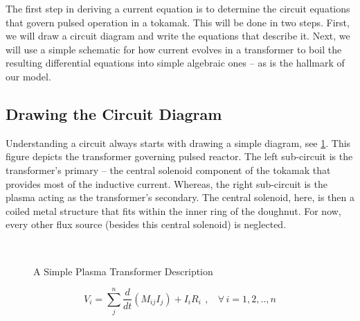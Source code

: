 The first step in deriving a current equation is to determine the circuit equations that govern pulsed operation in a tokamak. This will be done in two steps. First, we will draw a circuit diagram and write the equations that describe it. Next, we will use a simple schematic for how current evolves in a transformer to boil the resulting differential equations into simple algebraic ones -- as is the hallmark of our model.

\subsection{Drawing the Circuit Diagram}

Understanding a circuit always starts with drawing a simple diagram, see \cref{fig:circuit_diagram}. This figure depicts the transformer governing pulsed reactor. The left sub-circuit is the transformer's primary -- the central solenoid component of the tokamak that provides most of the inductive current. Whereas, the right sub-circuit is the plasma acting as the transformer's secondary. The central solenoid, here, is then a coiled metal structure that fits within the inner ring of the doughnut. For now, every other flux source (besides this central solenoid) is neglected.

\begin{figure}
\centering

\caption{A Simple Plasma Transformer Description} ~\\
\label{fig:circuit_diagram}
\end{figure}

\begin{equation}
	V_i = \sum_j^n \frac{d}{dt} \left( M_{ij} I_j \right) + I_i R_i \ \, , \ \ \ \ \forall \, i = 1,2,..,n
\end{equation}

